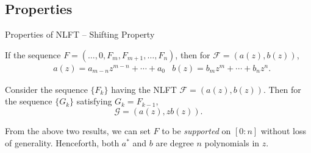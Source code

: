 \subsection{Properties}
\begin{frame}{Properties of NLFT -- Shifting Property}
    \begin{theorem}
        If the sequence $F = (\ldots,0,F_{m},F_{m+1},\ldots,F_{n})$, then for $\mathcal{F}=(a(z),b(z))$,
        \begin{align*}
            &a(z) = a_{m-n} z^{m-n} + \cdots + a_0 &b(z) = b_mz^m + \cdots + b_nz^n.
        \end{align*}
    \end{theorem}
    

    \begin{theorem}
        Consider the sequence $\{F_k\}$ having the NLFT $\mathcal{F} = (a(z),b(z))$. Then for the sequence $\{G_k\}$ satisfying $G_k = F_{k-1}$,
        \begin{equation}
            \mathcal{G} = \left(a(z),z b(z)\right).
        \end{equation}
    \end{theorem}

    From the above two results, we can set $F$ to be \textit{supported} on $[0:n]$ without loss of generality. Henceforth, both $a^*$ and $b$ are degree $n$ polynomials in $z$.
\end{frame}

